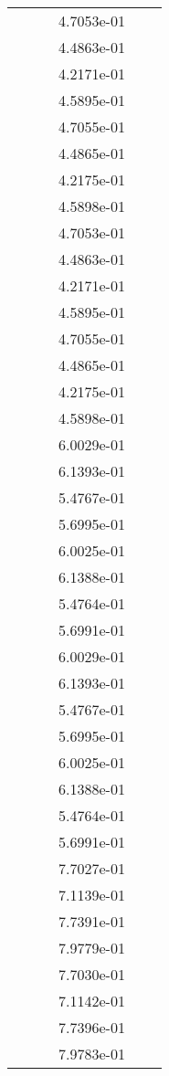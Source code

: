 \begin{xltabular}{\textwidth}{r|rS[table-format=1.3e+2]S[table-format=1.4e+2]S[table-format=1.4e+2]S[table-format=-1.5]}
&  &  & 4.7053e-01 & & \\
&  &  & 4.4863e-01 & & \\
&  &  & 4.2171e-01 & & \\
&  &  & 4.5895e-01 & & \\
&  &  & 4.7055e-01 & & \\
&  &  & 4.4865e-01 & & \\
&  &  & 4.2175e-01 & & \\
&  &  & 4.5898e-01 & & \\
&  &  & 4.7053e-01 & & \\
&  &  & 4.4863e-01 & & \\
&  &  & 4.2171e-01 & & \\
&  &  & 4.5895e-01 & & \\
&  &  & 4.7055e-01 & & \\
&  &  & 4.4865e-01 & & \\
&  &  & 4.2175e-01 & & \\
&  &  & 4.5898e-01 & & \\
&  &  & 6.0029e-01 & & \\
&  &  & 6.1393e-01 & & \\
&  &  & 5.4767e-01 & & \\
&  &  & 5.6995e-01 & & \\
&  &  & 6.0025e-01 & & \\
&  &  & 6.1388e-01 & & \\
&  &  & 5.4764e-01 & & \\
&  &  & 5.6991e-01 & & \\
&  &  & 6.0029e-01 & & \\
&  &  & 6.1393e-01 & & \\
&  &  & 5.4767e-01 & & \\
&  &  & 5.6995e-01 & & \\
&  &  & 6.0025e-01 & & \\
&  &  & 6.1388e-01 & & \\
&  &  & 5.4764e-01 & & \\
&  &  & 5.6991e-01 & & \\
&  &  & 7.7027e-01 & & \\
&  &  & 7.1139e-01 & & \\
&  &  & 7.7391e-01 & & \\
&  &  & 7.9779e-01 & & \\
&  &  & 7.7030e-01 & & \\
&  &  & 7.1142e-01 & & \\
&  &  & 7.7396e-01 & & \\
&  &  & 7.9783e-01 & & \\

\end{xltabular}
